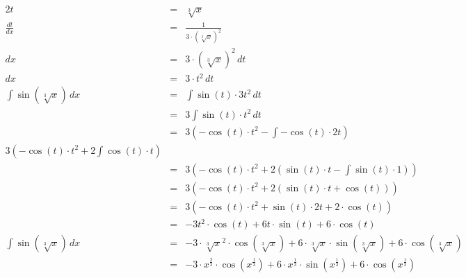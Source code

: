 \documentclass[10pt,a4paper,oneside,ngerman,numbers=noenddot]{scrartcl}
\begin{document}
\subsubsection{} %
\begin{alignat*}{2}
t &=& \sqrt[3]{x} \\
\frac{dt}{dx} &=& \frac{1}{3 \cdot \left(\sqrt[3]{x}\right)^{2}} \\
dx &=& 3 \cdot \left(\sqrt[3]{x}\right)^{2}\,dt \\
dx &=& 3 \cdot t^{2}\,dt\\
\int \sin(\sqrt[3]{x})\,dx &=& \int \sin(t) \cdot 3t^{2}\,dt\\
&=& 3 \int \sin(t) \cdot t^{2}\,dt \\
&=& 3\left(-\cos(t) \cdot t^{2} - \int -\cos(t) \cdot 2t \right) \\
3\left(-\cos(t) \cdot t^{2} + 2\int \cos(t) \cdot t \right) \\
&=& 3\left(-\cos(t) \cdot t^{2} + 2\left( \sin(t) \cdot t - \int \sin(t) \cdot 1 \right)\right) \\
&=& 3\left(-\cos(t) \cdot t^{2} + 2\left( \sin(t) \cdot t + \cos(t) \right)\right) \\
&=& 3\left(-\cos(t) \cdot t^{2} + \sin(t) \cdot 2t + 2 \cdot \cos(t)\right) \\
&=& -3t^{2} \cdot \cos(t) + 6t \cdot \sin(t) + 6 \cdot \cos(t) \\
\int \sin(\sqrt[3]{x})\,dx &=& -3 \cdot \sqrt[3]{x}^{2} \cdot \cos(\sqrt[3]{x}) + 6 \cdot \sqrt[3]{x} \cdot \sin(\sqrt[3]{x}) + 6 \cdot \cos(\sqrt[3]{x}) \\
&=& -3 \cdot x^{\frac{2}{3}} \cdot \cos(x^{\frac{1}{3}}) + 6 \cdot x^{\frac{1}{3}} \cdot \sin(x^{\frac{1}{3}}) + 6 \cdot \cos(x^{\frac{1}{3}})
\end{alignat*}
\end{document}
